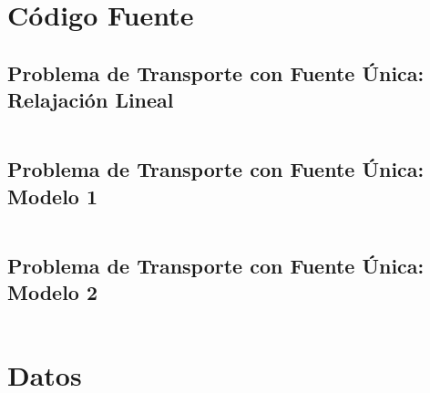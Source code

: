 \documentclass[a4paper, spanish]{article}
\begin{document}
  \begin{appendices}

    \section{Código Fuente}

      \subsection{Problema de Transporte con Fuente Única: Relajación Lineal}
      \label{appendix:source-code-relaxation}

        \inputminted{text}{./../mosel/single-source-transportation-problem-relaxation.mos}

      \subsection{Problema de Transporte con Fuente Única: Modelo 1}
      \label{appendix:source-code-model-1}

        \inputminted{text}{./../mosel/single-source-transportation-problem-model-1.mos}

      \subsection{Problema de Transporte con Fuente Única: Modelo 2}
      \label{appendix:source-code-model-2}

        \inputminted{text}{./../mosel/single-source-transportation-problem-model-2.mos}

    \section{Datos}
    \label{appendix:data}

      \inputminted{text}{./../mosel/data.dat}

  \end{appendices}






  \nocite{subject:pent2017}
  \nocite{tool:xpress-mosel}
  \nocite{repository:network-flow-transeuro}

  
  
\end{document}
